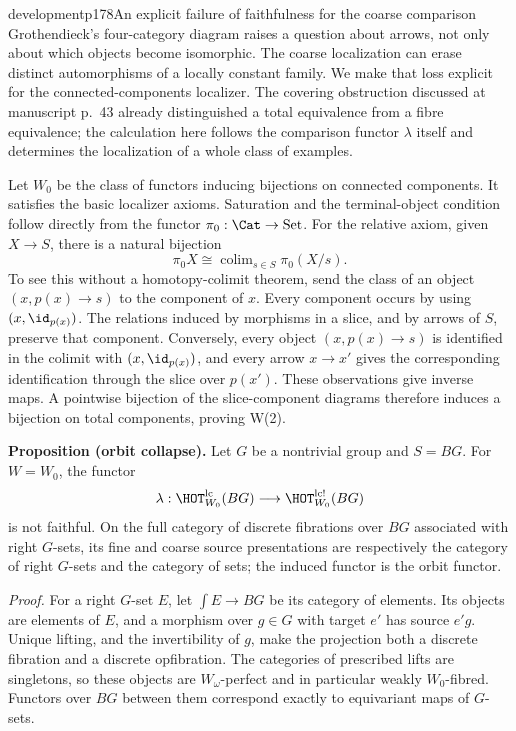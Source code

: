 \begin{dcomment}{development}{p178}{An explicit failure of faithfulness for the coarse comparison}
Grothendieck's four-category diagram raises a question about arrows, not only about which objects become isomorphic. The coarse localization can erase distinct automorphisms of a locally constant family. We make that loss explicit for the connected-components localizer. The covering obstruction discussed at manuscript p.~43 already distinguished a total equivalence from a fibre equivalence; the calculation here follows the comparison functor $\lambda$ itself and determines the localization of a whole class of examples.

Let $W_0$ be the class of functors inducing bijections on connected components. It satisfies the basic localizer axioms. Saturation and the terminal-object condition follow directly from the functor $\pi_0:\Cat\to\mathrm{Set}$. For the relative axiom, given $X\to S$, there is a natural bijection
\[
 \pi_0X\cong\mathop{\mathrm{colim}}_{s\in S}\pi_0(X/s).
\]
To see this without a homotopy-colimit theorem, send the class of an object $(x,p(x)\to s)$ to the component of $x$. Every component occurs by using $(x,\id_{p(x)})$. The relations induced by morphisms in a slice, and by arrows of $S$, preserve that component. Conversely, every object $(x,p(x)\to s)$ is identified in the colimit with $(x,\id_{p(x)})$, and every arrow $x\to x'$ gives the corresponding identification through the slice over $p(x')$. These observations give inverse maps. A pointwise bijection of the slice-component diagrams therefore induces a bijection on total components, proving W(2).

\textbf{Proposition (orbit collapse).}\ours\quad
Let $G$ be a nontrivial group and $S=BG$. For $W=W_0$, the functor
\[
 \lambda:\HOT_{W_0}^{\mathrm{lc}}(BG)
 \longrightarrow\HOT_{W_0}^{\mathrm{lc}!}(BG)
\]
is not faithful. On the full category of discrete fibrations over $BG$ associated with right $G$-sets, its fine and coarse source presentations are respectively the category of right $G$-sets and the category of sets; the induced functor is the orbit functor.

\emph{Proof.} For a right $G$-set $E$, let $\int E\to BG$ be its category of elements. Its objects are elements of $E$, and a morphism over $g\in G$ with target $e'$ has source $e'g$. Unique lifting, and the invertibility of $g$, make the projection both a discrete fibration and a discrete opfibration. The categories of prescribed lifts are singletons, so these objects are $W_\omega$-perfect and in particular weakly $W_0$-fibred. Functors over $BG$ between them correspond exactly to equivariant maps of $G$-sets.


\end{dcomment}
